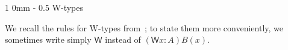 \documentclass[reqno,10pt,a4paper,oneside]{amsart}
\makeatletter
\numberwithin{equation}{section}
\renewcommand{\section}{\@startsection
  {section}%
   {1}%
  {0mm}%
   {-\baselineskip}%
  {0.5\baselineskip}%
   {\Large\bfseries}}%
\theoremstyle{mythm}
\theoremstyle{mydef}
\theoremstyle{myrmk}
\newcommand{\W}{\mathsf{W}}
\newcommand{\wsup}{\mathsf{sup}}
\newcommand{\wind}{\mathsf{wind}}
\newcommand{\UU}{\mathsf{U}}
\makeatother
\begin{document}

\newpage
\section{W-types}
\label{section:wfiles}



We recall the rules for W-types from~\cite{MartinLofP:inttt}; to state them more conveniently, we sometimes write simply $\W$ instead of $(\W{x : A})B(x)$.
\end{document}
